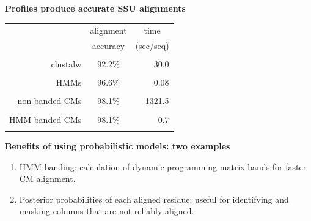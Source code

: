 \documentclass[landscape]{slides}
\begin{document}
\begin{slide}
\begin{center}
\textbf{Profiles produce accurate SSU alignments}
\end{center}
\medskip
\medskip
\begin{center}

\begin{tabular}{rcr} 
& \multicolumn{1}{c}{alignment} & \multicolumn{1}{c}{time} \\
& \multicolumn{1}{c}{accuracy} & \multicolumn{1}{c}{(sec/seq)} \\ \hline
& \multicolumn{1}{c}{} & \multicolumn{1}{c}{} \\
clustalw & 92.2\% & 30.0 \\ 
& \multicolumn{1}{c}{} & \multicolumn{1}{c}{} \\
HMMs & 96.6\% & 0.08 \\ 
& \multicolumn{1}{c}{} & \multicolumn{1}{c}{} \\
non-banded CMs & 98.1\% & 1321.5 \\ 
& \multicolumn{1}{c}{} & \multicolumn{1}{c}{} \\
HMM banded CMs & 98.1\% & 0.7 \\ %
& \multicolumn{1}{c}{} & \multicolumn{1}{c}{} \\
\end{tabular}
\end{center}

\vfill
\end{slide}
\begin{slide}
\begin{center}
\textbf{Benefits of using probabilistic models: two examples}
\end{center}

\begin{enumerate} 
\item HMM banding: calculation of dynamic programming matrix bands for
  faster CM alignment.
\item Posterior probabilities of each aligned residue: useful for
  identifying and masking columns that are not reliably
  aligned. 
\end{enumerate}

\vfill
\end{slide}
\end{document}
